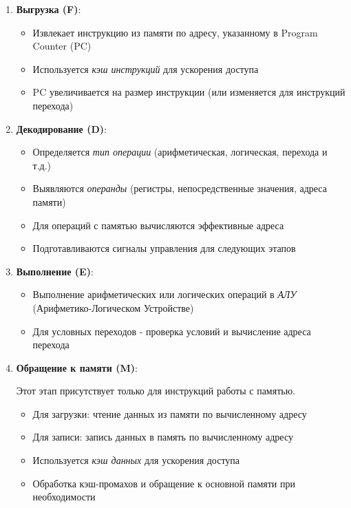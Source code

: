 \documentclass[12pt,a4paper]{article}
\begin{document}
\begin{enumerate}
    \item \textbf{Выгрузка (F)}:
    \begin{itemize}
        \item Извлекает инструкцию из памяти по адресу, указанному в Program Counter (PC)
        \item Используется \textit{кэш инструкций} для ускорения доступа
        \item PC увеличивается на размер инструкции (или изменяется для инструкций перехода)
    \end{itemize}

    \item \textbf{Декодирование (D)}:
    \begin{itemize}
        \item Определяется \textit{тип операции} (арифметическая, логическая, перехода и т.д.)
        \item Выявляются \textit{операнды} (регистры, непосредственные значения, адреса памяти)
        \item Для операций с памятью вычисляются эффективные адреса
        \item Подготавливаются сигналы управления для следующих этапов
    \end{itemize}

    \item \textbf{Выполнение (E)}:
    \begin{itemize}
        \item Выполнение арифметических или логических операций в \textit{АЛУ} (Арифметико-Логическом Устройстве)
        \item Для условных переходов - проверка условий и вычисление адреса перехода
    \end{itemize}

    \item \textbf{Обращение к памяти (M)}:
    
    Этот этап присутствует только для инструкций работы с памятью.
    \begin{itemize}
    \item Для загрузки: чтение данных из памяти по вычисленному адресу
    \item Для записи: запись данных в память по вычисленному адресу
    \item Используется \textit{кэш данных} для ускорения доступа
    \item Обработка кэш-промахов и обращение к основной памяти при необходимости
    \end{itemize}


\end{enumerate}
\end{document}
